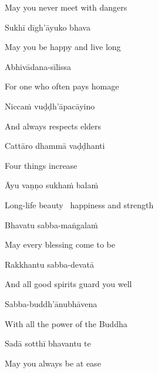 \begin{english}
  May you never meet with dangers
\end{english}

Sukhī dīgh'āyuko bhava

\begin{english}
  May you be happy and live long
\end{english}

\suttaRef{[Dhp A]}

Abhivādana-sīlissa

\begin{english}
  For one who often pays homage
\end{english}

Niccaṁ vuḍḍh'āpacāyino

\begin{english}
  And always respects elders
\end{english}

Cattāro dhammā vaḍḍhanti

\begin{english}
  Four things increase
\end{english}

Āyu vaṇṇo sukhaṁ balaṁ

\begin{english}
  Long-life beauty \breathmark\ happiness and strength
\end{english}

\suttaRef{[Dhp 109]}

Bhavatu sabba-maṅgalaṁ

\begin{english}
  May every blessing come to be
\end{english}

Rakkhantu sabba-devatā

\begin{english}
  And all good spirits guard you well
\end{english}

Sabba-buddh'ānubhāvena

\begin{english}
  With all the power of the Buddha
\end{english}

Sadā sotthī bhavantu te

\begin{english}
  May you always be at ease
\end{english}

\ifbfiveversion\clearpage\fi

